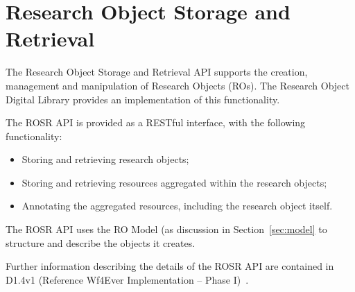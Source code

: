 \section{Research Object Storage and Retrieval}
\label{sec:rosrs}

The Research Object Storage and Retrieval API supports the creation,
management and manipulation of Research Objects (ROs). The Research
Object Digital Library provides an implementation of this
functionality. 

The ROSR API is provided as a RESTful interface, with the following functionality:

\begin{itemize}
\item Storing and retrieving research objects;
\item Storing and retrieving resources aggregated within the research objects;
\item Annotating the aggregated resources, including the research object itself. 
\end{itemize}

The ROSR API uses the RO Model (as discussion in Section~\ref{sec:model} to structure and describe the objects it creates. 

Further information describing the details of the ROSR API are
contained in D1.4v1 (Reference Wf4Ever Implementation -- Phase I)~\cite{D1.4v1}.


